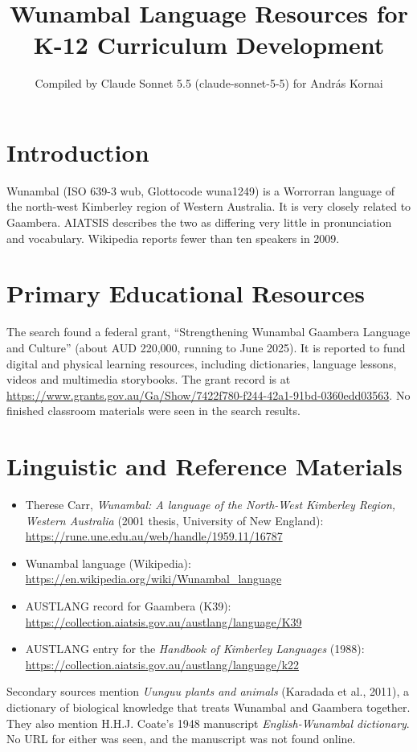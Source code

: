 \documentclass[12pt]{article}
\title{Wunambal Language Resources for K-12 Curriculum Development}
\author{Compiled by Claude Sonnet 5.5 (claude-sonnet-5-5) for Andr\'as Kornai}
\date{}
\begin{document}
\maketitle

\section{Introduction}
Wunambal (ISO 639-3 wub, Glottocode wuna1249) is a Worrorran language of the north-west Kimberley region of Western Australia. It is very closely related to Gaambera. AIATSIS describes the two as differing very little in pronunciation and vocabulary. Wikipedia reports fewer than ten speakers in 2009.

\section{Primary Educational Resources}
The search found a federal grant, ``Strengthening Wunambal Gaambera Language and Culture'' (about AUD 220,000, running to June 2025). It is reported to fund digital and physical learning resources, including dictionaries, language lessons, videos and multimedia storybooks. The grant record is at \url{https://www.grants.gov.au/Ga/Show/7422f780-f244-42a1-91bd-0360edd03563}. No finished classroom materials were seen in the search results.

\section{Linguistic and Reference Materials}
\begin{itemize}
\item Therese Carr, \emph{Wunambal: A language of the North-West Kimberley Region, Western Australia} (2001 thesis, University of New England): \url{https://rune.une.edu.au/web/handle/1959.11/16787}
\item Wunambal language (Wikipedia): \url{https://en.wikipedia.org/wiki/Wunambal_language}
\item AUSTLANG record for Gaambera (K39): \url{https://collection.aiatsis.gov.au/austlang/language/K39}
\item AUSTLANG entry for the \emph{Handbook of Kimberley Languages} (1988): \url{https://collection.aiatsis.gov.au/austlang/language/k22}
\end{itemize}
Secondary sources mention \emph{Uunguu plants and animals} (Karadada et al., 2011), a dictionary of biological knowledge that treats Wunambal and Gaambera together. They also mention H.H.J. Coate's 1948 manuscript \emph{English-Wunambal dictionary}. No URL for either was seen, and the manuscript was not found online.
\end{document}
